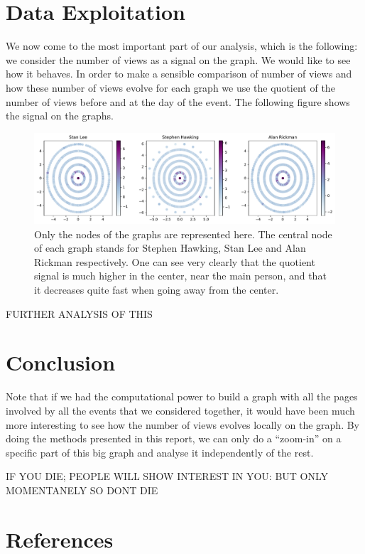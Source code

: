 \documentclass[conference]{IEEEtran}
\begin{document}
\section{Data Exploitation} \label{exploitation}

We now come to the most important part of our analysis, which is the following: we consider the number of views as a signal on the graph. We would like to see how it behaves. In order to make a sensible comparison of number of views and how these number of views evolve for each graph we use the quotient of the number of views before and at the day of the event. 
The following figure shows the signal on the graphs. 
\begin{figure}[!htb]
  \includegraphics[width=\linewidth]{signal_scatter.pdf}
\caption{Only the nodes of the graphs are represented here. The central node of each graph stands for Stephen Hawking, Stan Lee and Alan Rickman respectively. One can see very clearly that the quotient signal is much higher in the center, near the main person, and that it decreases quite fast when going away from the center.}
\end{figure}

FURTHER ANALYSIS OF THIS

\section{Conclusion} \label{conclusion}

Note that if we had the computational power to build a graph with all the pages involved by all the events that we considered together, it would have been much more interesting to see how the number of views evolves locally on the graph. By doing the methods presented in this report, we can only do a “zoom-in” on a specific part of this big graph and analyse it independently of the rest. 

IF YOU DIE; PEOPLE WILL SHOW INTEREST IN YOU: BUT ONLY MOMENTANELY SO DONT DIE

\section*{References}


\cite{laplacian}  
\cite{signalprocessing}
\cite{clustering}



\end{document}
